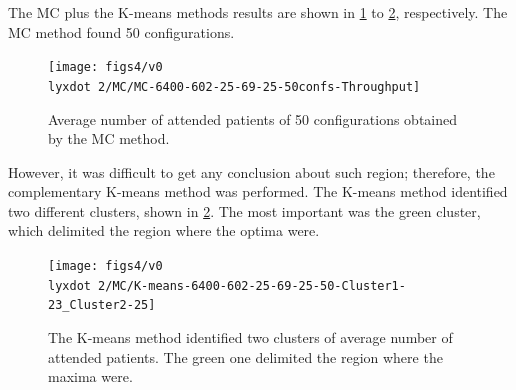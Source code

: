 \documentclass[11pt]{article} %
\begin{document}
The MC plus the K-means methods results are shown in \ref{subfig:mc4-2}
to \ref{subfig:km4-2}, respectively. The MC method found 50 configurations.
\begin{figure}[H]
\centering{}\vspace*{-0.2cm}\texttt{[image: figs4/v0\\lyxdot 2/MC/MC-6400-602-25-69-25-50confs-Throughput]}\caption{Average number of attended patients of 50 configurations obtained
by the MC method.\label{subfig:mc4-2}}
\end{figure}
However, it was difficult to get any conclusion about such region;
therefore, the complementary K-means method was performed. The K-means
method identified two different clusters, shown in \ref{subfig:km4-2}.
The most important was the green cluster, which delimited the region
where the optima were.
\begin{figure}[H]
\begin{centering}
\vspace*{-0.2cm}\texttt{[image: figs4/v0\\lyxdot 2/MC/K-means-6400-602-25-69-25-50-Cluster1-23\_Cluster2-25]}
\par\end{centering}

\caption{The K-means method identified two clusters of average number of attended
patients. The green one delimited the region where the maxima were.\label{subfig:km4-2}}
\end{figure}

\end{document}

